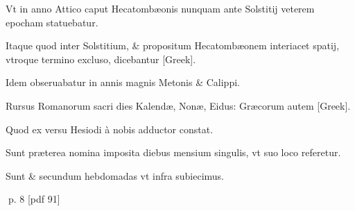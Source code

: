 \begin{parnumbers}
Vt in anno Attico caput Hecatombæonis nunquam ante Solstitij veterem epocham statuebatur.

Itaque quod inter Solstitium, \& propositum Hecatombæonem interiacet spatij, vtroque termino excluso, dicebantur \textgreek{[Greek]}.

Idem obseruabatur in annis magnis Metonis \& Calippi.

Rursus Romanorum sacri dies Kalendæ, Nonæ, Eidus: Græcorum autem \textgreek{[Greek]}.

Quod ex versu Hesiodi à nobis adductor constat.

Sunt præterea nomina imposita diebus mensium  singulis, vt suo loco referetur.

Sunt \& secundum hebdomadas vt infra subiecimus.
\end{parnumbers}
\clearpage
p. 8 [pdf 91]


